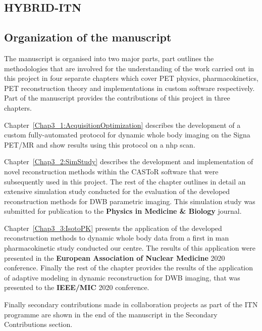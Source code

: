 \subsection*{HYBRID-ITN}


\subsection*{Organization of the manuscript}
The manuscript is organised into two major parts, part \textbf{} outlines the methodologies that are involved for the understanding of the work carried out in this project in four separate chapters which cover PET physics, pharmacokinetics, PET reconstruction theory and implementations in custom software respectively. Part \textbf{} of the manuscript provides the contributions of this project in three chapters.

Chapter~\ref{Chap3_1:AcquisitionOptimization} describes the development of a custom fully-automated protocol for dynamic whole body imaging on the Signa PET/MR and show results using this protocol on a \gls{nhp} scan.

Chapter~\ref{Chap3_2:SimStudy} describes the development and implementation of novel reconstruction methods within the CASToR software that were subsequently used in this project. The rest of the chapter outlines in detail an extensive simulation study conducted for the evaluation of the developed reconstruction methods for DWB parametric imaging. This simulation study was submitted for publication to the
\textbf{Physics in Medicine \& Biology} journal. 

Chapter~\ref{Chap3_3:IsotoPK} presents the application of the developed reconstruction methods to dynamic whole body data from a first in man pharmacokinetic study conducted our centre. The results of this application were presented in the \textbf{European Association of Nuclear Medicine} 2020 conference. Finally the rest of the chapter provides the results of the application of adaptive modeling in dynamic reconstruction for DWB imaging, that was presented to the \textbf{IEEE/MIC} 2020 conference. 

Finally secondary contributions made in collaboration projects as part of the ITN programme are shown in the end of the manuscript in the Secondary Contributions section. 